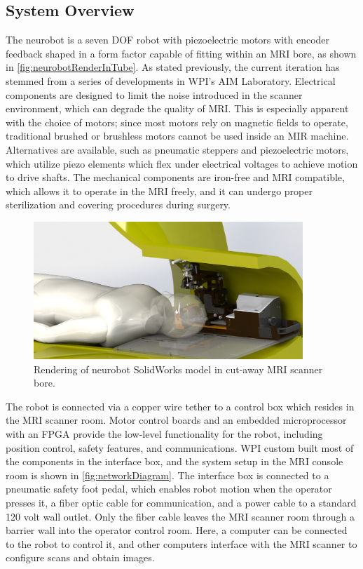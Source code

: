 \documentclass[12pt]{report}
\begin{document}
\subsection{System Overview}
The neurobot is a seven DOF robot with piezoelectric motors with encoder feedback shaped in a form factor capable of fitting within an MRI bore, as shown in \autoref{fig:neurobotRenderInTube}. As stated previously, the current iteration has stemmed from a series of developments in WPI's AIM Laboratory. \cite{aimLabRobot} Electrical components are designed to limit the noise introduced in the scanner environment, which can degrade the quality of MRI. This is especially apparent with the choice of motors; since most motors rely on magnetic fields to operate, traditional brushed or brushless motors cannot be used inside an MIR machine. Alternatives are available, such as pneumatic steppers and piezoelectric motors, which utilize piezo elements which flex under electrical voltages to achieve motion to drive shafts. \cite{piezoLegs} The mechanical components are iron-free and MRI compatible, which allows it to operate in the MRI freely, and it can undergo proper sterilization and covering procedures during surgery.

\begin{figure}[thpb]
	\centering
	\includegraphics[width=4in]{images/neurobot_rendering_with_patient_in_bore.png}
    \caption{Rendering of neurobot SolidWorks model in cut-away MRI scanner bore.}
    \label{fig:neurobotRenderInTube}
\end{figure}

The robot is connected via a copper wire tether to a control box which resides in the MRI scanner room. Motor control boards and an embedded microprocessor with an FPGA provide the low-level functionality for the robot, including position control, safety features, and communications. WPI custom built most of the components in the interface box, and the system setup in the MRI console room is shown in \autoref{fig:networkDiagram}. The interface box is connected to a pneumatic safety foot pedal, which enables robot motion when the operator presses it, a fiber optic cable for communication, and a power cable to a standard 120 volt wall outlet. Only the fiber cable leaves the MRI scanner room through a barrier wall into the operator control room. Here, a computer can be connected to the robot to control it, and other computers interface with the MRI scanner to configure scans and obtain images. 
\end{document}
